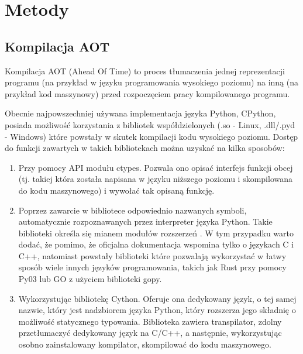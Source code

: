 \documentclass[11pt, a4paper]{article}
\begin{document}
\begin{sloppypar}
    \section{Metody}


    \subsection{Kompilacja AOT}


    Kompilacja AOT (Ahead Of Time) to proces tłumaczenia jednej reprezentacji programu (na
    przykład w języku programowania wysokiego poziomu) na inną (na przykład kod
    maszynowy) przed rozpoczęciem pracy kompilowanego programu.

    Obecnie najpowszechniej używana implementacja języka Python, CPython, posiada możliwość
    korzystania z bibliotek współdzielonych (.so - Linux, .dll/.pyd - Windows) które powstały
    w skutek kompilacji kodu wysokiego poziomu. Dostęp do funkcji zawartych w takich
    bibliotekach można uzyskać na kilka sposobów:

    \begin{enumerate}
      \item Przy pomocy API modułu ctypes\cite{Python_ctypes}. Pozwala ono opisać interfejs
        funkcji obcej (tj. takiej która została napisana w języku niższego poziomu i skompilowana
        do kodu maszynowego) i wywołać tak opisaną funkcję.

      \item Poprzez zawarcie w bibliotece odpowiednio nazwanych symboli, automatycznie
        rozpoznawanych przez interpreter języka Python. Takie biblioteki określa się mianem
        modułów rozszerzeń \cite{Extending_Python_With_C_Cpp}. W tym przypadku warto
        dodać, że pomimo, że oficjalna dokumentacja wspomina tylko o językach C i C++, natomiast
        powstały biblioteki które pozwalają wykorzystać w łatwy sposób wiele innych języków
        programowania, takich jak Rust przy pomocy Py03\cite{PyO3} lub GO z użyciem biblioteki
        gopy\cite{gopy}.

      \item Wykorzystując bibliotekę Cython\cite{Cython_Org}\cite{Cython_The_Best_Of_Both}.
        Oferuje ona dedykowany język, o tej samej nazwie, który jest nadzbiorem języka
        Python, który rozszerza jego składnię o możliwość statycznego typowania.
        Biblioteka zawiera transpilator, zdolny przetłumaczyć dedykowany język na C/C++,
        a następnie, wykorzystując osobno zainstalowany kompilator, skompilować do kodu
        maszynowego.


\end{enumerate}
\end{sloppypar}
\end{document}
